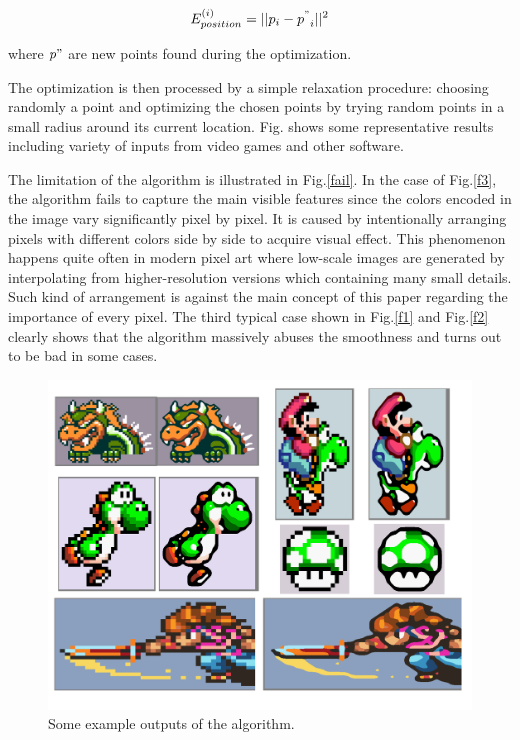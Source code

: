 \documentclass{article}
\begin{document}
\[ E_{position}^{(i)} = ||p_i - {p^"}_i ||^2 \]

where $p"$ are new points found during the optimization.

The optimization is then processed by a simple relaxation procedure: choosing randomly a point and optimizing the chosen points by trying random points in a small radius around its current location.
Fig. shows some representative results including variety of inputs from video games and other software. 

The limitation of the algorithm is illustrated in Fig.\ref{fail}. In the case of Fig.\ref{f3}, the algorithm fails to capture the main visible features since the colors encoded in the image vary significantly pixel by pixel. It is caused by intentionally arranging pixels with different colors side by side to acquire visual effect. This phenomenon happens quite often in modern pixel art where low-scale images are generated by interpolating from higher-resolution versions which containing many small details. Such kind of arrangement is against the main concept of this paper regarding the importance of every pixel. The third typical case shown in Fig.\ref{f1} and Fig.\ref{f2} clearly shows that the algorithm massively abuses the smoothness and turns out to be bad in some cases. 
\begin{figure}
  \centering
    \includegraphics[width=\textwidth]{suc}
  \caption{Some example outputs of the algorithm.}
  \label{fig:suc}
\end{figure}
\end{document}
